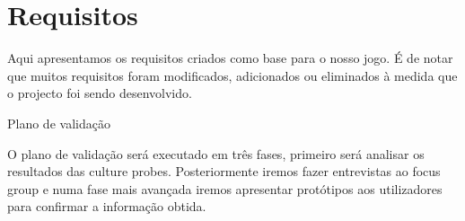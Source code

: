 \chapter{Requisitos}
\label{chap:requir} 
Aqui apresentamos os requisitos criados como base para o nosso jogo.
É de notar que muitos requisitos foram modificados, adicionados ou eliminados à medida que o projecto foi sendo desenvolvido.

Plano de validação

    O plano de validação será executado em três fases, primeiro será analisar os resultados das culture probes. Posteriormente iremos fazer entrevistas ao focus group e numa fase mais avançada iremos apresentar protótipos aos utilizadores para confirmar a informação obtida.

